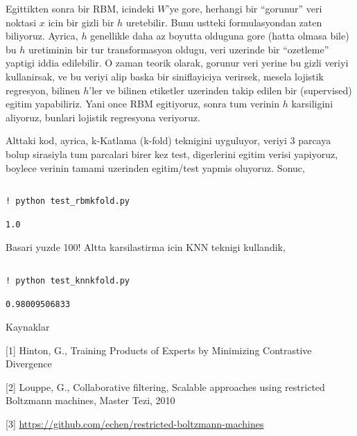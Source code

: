 \documentclass[12pt,fleqn]{article}\usepackage{../common}
\begin{document}
Egittikten sonra bir RBM, icindeki $W$'ye gore, herhangi bir ``gorunur''
veri noktasi $x$ icin bir gizli bir $h$ uretebilir. Bunu ustteki
formulasyondan zaten biliyoruz. Ayrica, $h$ genellikle daha az boyutta
olduguna gore (hatta olmasa bile) bu $h$ uretiminin bir tur transformasyon
oldugu, veri uzerinde bir ``ozetleme'' yaptigi iddia edilebilir. O zaman
teorik olarak, gorunur veri yerine bu gizli veriyi kullanirsak, ve bu
veriyi alip baska bir siniflayiciya verirsek, mesela lojistik regresyon,
bilinen $h$'ler ve bilinen etiketler uzerinden takip edilen bir (supervised)
egitim yapabiliriz. Yani once RBM egitiyoruz, sonra tum verinin $h$
karsiligini aliyoruz, bunlari lojistik regresyona veriyoruz. 

Alttaki kod, ayrica, k-Katlama (k-fold) teknigini uyguluyor, veriyi 3
parcaya bolup sirasiyla tum parcalari birer kez test, digerlerini egitim
verisi yapiyoruz, boylece verinin tamami uzerinden egitim/test yapmis
oluyoruz. Sonuc,

\inputminted[fontsize=\footnotesize]{python}{test_rbmkfold.py}

\begin{verbatim}
! python test_rbmkfold.py
\end{verbatim}

\begin{verbatim}
1.0
\end{verbatim}

Basari yuzde 100! Altta karsilastirma icin KNN teknigi kullandik,

\inputminted[fontsize=\footnotesize]{python}{test_knnkfold.py}

\begin{verbatim}
! python test_knnkfold.py
\end{verbatim}

\begin{verbatim}
0.98009506833
\end{verbatim}

Kaynaklar

[1] Hinton, G., Training Products of Experts by Minimizing Contrastive
Divergence

[2] Louppe, G., Collaborative filtering, Scalable approaches using
restricted Boltzmann machines, Master Tezi, 2010

[3] \url{https://github.com/echen/restricted-boltzmann-machines}
\end{document}
